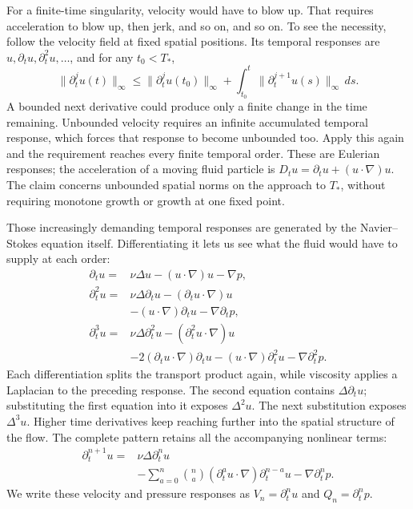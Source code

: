 For a finite-time singularity, velocity would have to blow up. That requires
acceleration to blow up, then jerk, and so on, and so on. To see the necessity,
follow the velocity field at fixed spatial positions. Its temporal responses
are \(u,\partial_tu,\partial_t^2u,\ldots\), and for any \(t_0<T_*\),
\[
 \|\partial_t^ju(t)\|_\infty
 \le \|\partial_t^ju(t_0)\|_\infty
 +\int_{t_0}^{t}\|\partial_t^{j+1}u(s)\|_\infty\,ds.
\]
A bounded next derivative could produce only a finite change in the time
remaining. Unbounded velocity requires an infinite accumulated temporal
response, which forces that response to become unbounded too. Apply this
again and the requirement reaches every finite temporal order. These are
Eulerian responses; the acceleration of a moving fluid particle is
\(D_tu=\partial_tu+(u\cdot\nabla)u\). The claim concerns unbounded spatial
norms on the approach to \(T_*\), without requiring monotone growth or
growth at one fixed point.

Those increasingly demanding temporal responses are generated by the
Navier--Stokes equation itself. Differentiating it lets us see what the
fluid would have to supply at each order:
\[
 \begin{aligned}
 \partial_tu={}&\nu\Delta u-(u\cdot\nabla)u-\nabla p,\\
 \partial_t^2u={}&\nu\Delta\partial_tu
 -(\partial_tu\cdot\nabla)u\\
 &-(u\cdot\nabla)\partial_tu-\nabla\partial_tp,\\
 \partial_t^3u={}&\nu\Delta\partial_t^2u
 -(\partial_t^2u\cdot\nabla)u\\
 &-2(\partial_tu\cdot\nabla)\partial_tu
 -(u\cdot\nabla)\partial_t^2u
 -\nabla\partial_t^2p.
 \end{aligned}
\]
Each differentiation splits the transport product again, while viscosity
applies a Laplacian to the preceding response. The second equation contains
\(\Delta\partial_tu\); substituting the first equation into it exposes
\(\Delta^2u\). The next substitution exposes \(\Delta^3u\). Higher time
derivatives keep reaching further into the spatial structure of the flow.
The complete pattern retains all the accompanying nonlinear terms:
\[
 \begin{aligned}
 \partial_t^{n+1}u={}&\nu\Delta\partial_t^nu\\
 &-\sum_{a=0}^{n}\binom na
 (\partial_t^au\cdot\nabla)\partial_t^{n-a}u
 -\nabla\partial_t^np.
 \end{aligned}
\]
We write these velocity and pressure responses as
\(V_n=\partial_t^nu\) and \(Q_n=\partial_t^np\).

